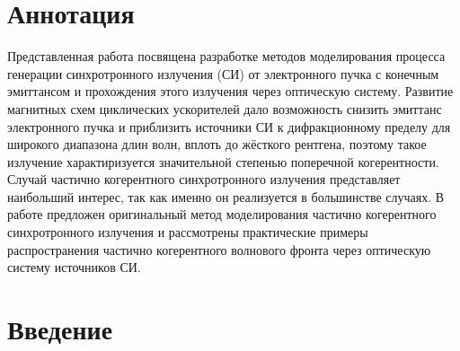 \chapter*{Аннотация }							%
 Представленная работа посвящена разработке методов моделирования процесса генерации синхротронного излучения (СИ) от электронного пучка с конечным эмиттансом и прохождения этого излучения через оптическую систему. Развитие магнитных схем циклических ускорителей дало возможность снизить эмиттанс электронного пучка и приблизить источники СИ к дифракционному пределу для широкого диапазона длин волн, вплоть до жёсткого рентгена, поэтому такое излучение характиризуется значительной степенью поперечной когерентности. Случай частично когерентного синхротронного излучения представляет наибольший интерес, так как именно он реализуется в большинстве случаях. В работе предложен оригинальный метод моделирования частично когерентного синхротронного излучения и рассмотрены практические примеры распространения частично когерентного волнового фронта через оптическую систему источников СИ. 

\chapter*{Введение}							%

\newcommand{\actuality}{Актуальность}
\newcommand{\aim}{\textbf{Целью}}
\newcommand{\tasks}{Задачи}
\newcommand{\defpositions}{\textbf{Основные положения, выносимые на~защиту:}}
\newcommand{\novelty}{\textbf{Научная новизна}}
\newcommand{\influence}{\textbf{Научная и практическая значимость}}
\newcommand{\reliability}{\textbf{Степень достоверности}}
\newcommand{\probation}{\textbf{Апробация работы.}}
\newcommand{\contribution}{\textbf{Личный вклад.}}
\newcommand{\publications}{\textbf{Публикации.}}



